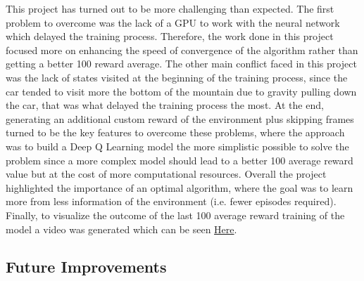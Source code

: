 This project has turned out to be more challenging than expected. The first problem to overcome was the lack of a GPU to work with the neural network which delayed the training process. Therefore, the work done in this project focused more on enhancing the speed of convergence of the algorithm rather than getting a better 100 reward average. The other main conflict faced in this project was the lack of states visited at the beginning of the training process, since the car tended to visit more the bottom of the mountain due to gravity pulling down the car, that was what delayed the training process the most. At the end, generating an additional custom reward of the environment plus skipping frames turned to be the key features to overcome these problems, where the approach was to build a Deep Q Learning model the more simplistic possible to solve the problem since a more complex model should lead to a better 100 average reward value but at the cost of more computational resources. Overall the project highlighted the importance of an optimal algorithm, where the goal was to learn more from less information of the environment (i.e. fewer episodes required). Finally, to visualize the outcome of the last 100 average reward training of the model a video was generated which can be seen \href{https://youtu.be/PxzqPLuuu5o}{Here}.
\subsection{Future Improvements}



